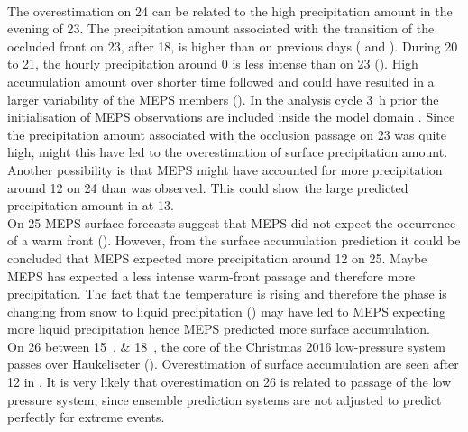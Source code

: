 \\
The overestimation on \SI{24}{\dec} can be related to the high precipitation amount in the evening of \SI{23}{\dec}.
The precipitation amount associated with the transition of the occluded front on \SI{23}{\dec}, after \SI{18}{\UTC}, is higher than on previous days ( and ). During \num{20} to \SI{21}{\dec}, the hourly precipitation around \SI{0}{\UTC} is less intense than on \SI{23}{\dec} (). High accumulation amount over shorter time followed and could have resulted in a larger variability of the MEPS members (). 
In the analysis cycle \SI{3}{\hour} prior the initialisation of MEPS observations are included inside the model domain \citep{homleid_verification_2016}. Since the precipitation amount associated with the occlusion passage on \SI{23}{\dec} was quite high, might this have led to the overestimation of surface precipitation amount. \citep{homleid_verification_2016}
\\
Another possibility is that MEPS might have accounted for more precipitation  around \SI{12}{\UTC} on \SI{24}{\dec} than was observed. This could show the large predicted precipitation amount in  at \SI{13}{\UTC}.
\\
On \SI{25}{\dec} MEPS surface forecasts suggest that MEPS did not expect the occurrence of a warm front (). 
However, from the surface accumulation prediction 
it could be concluded that MEPS expected more precipitation around \SI{12}{\UTC} on \SI{25}{\dec}. Maybe MEPS has expected a less intense warm-front passage and therefore more precipitation. The fact that the temperature is rising and therefore the phase is changing from snow to liquid precipitation () may have led to MEPS expecting more liquid precipitation%
hence MEPS predicted more surface accumulation.
\\
On \SI{26}{\dec} between \SIlist{15;18}{\UTC}, the core of the Christmas 2016 low-pressure system passes over Haukeliseter (). Overestimation of surface accumulation are seen after \SI{12}{\UTC} in . It is very likely that overestimation on \SI{26}{\dec} is related to passage of the low pressure system, since ensemble prediction systems are not adjusted to predict perfectly for extreme events.
